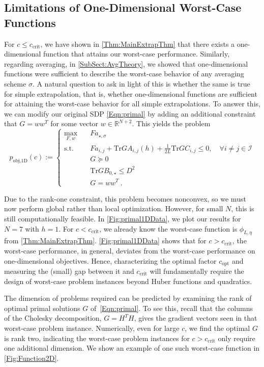 \documentclass[11pt]{article}
\numberwithin{equation}{section}
\newcommand{\R}{\mathbb{R}}
\newcommand{\Tr}{\text{Tr}}
\theoremstyle{definition}
\theoremstyle{definition}
\theoremstyle{definition}
\newcommand{\1}{\mathbf{1}}
\newcommand{\idxSpecial}{\sigma}
\newcommand{\cCrit}{c_\mathrm{crit}}
\begin{document}
\subsection{Limitations of One-Dimensional Worst-Case Functions} \label{SubSect:OneDimensional}
For $c\leq \cCrit$, we have shown in \cref{Thm:MainExtrapThm} that there exists a one-dimensional function that attains our worst-case performance. Similarly, regarding averaging, in \cref{SubSect:AvgTheory}, we showed that one-dimensional functions were sufficient to describe the worst-case behavior of any averaging scheme $\sigma$. A natural question to ask in light of this is whether the same is true for simple extrapolation, that is, whether one-dimensional  functions are sufficient for attaining the worst-case behavior for all simple extrapolations. To answer this, we can modify our original SDP \eqref{Eqn:primal} by adding an additional constraint that $G = ww^T$ for some vector $w \in \R^{N+2}$. This yields the problem
\begin{equation} \label{Eqn:primal1D}
    p_{\text{obj,1D}}(c) := \begin{cases} \max_{F,w} \quad & F a_{\star,\idxSpecial} \\
                    \text{s.t. } & Fa_{i,j} + \Tr G A_{i,j}(h) + \frac{1}{2L}\Tr G C_{i,j} \leq 0, \quad\forall i \neq j \in \mathcal{I}\\
                    & G \succeq 0 \\
                    & \Tr G B_{0,\star} \leq D^2 \\
                    & G = ww^T \ .
                \end{cases}
\end{equation}

Due to the rank-one constraint, this problem becomes nonconvex, so we must now perform global rather than local optimization. However, for small $N$, this is still computationally feasible. In \cref{Fig:primal1DData}, we plot our results for $N=7$ with $h=1$. For $c < \cCrit$, we already know the worst-case function is $\phi_{L,\eta}$ from \cref{Thm:MainExtrapThm}. \cref{Fig:primal1DData} shows that for $c>\cCrit$, the worst-case performance, in general, deviates from the worst-case performance on one-dimensional objectives. Hence, characterizing the optimal factor $c_{\text{opt}}$ and measuring the (small) gap between it and $\cCrit$ will fundamentally require the design of worst-case problem instances beyond Huber functions and quadratics.

The dimension of problems required can be predicted by examining the rank of optimal primal solutions $G$ of~\eqref{Eqn:primal}. To see this, recall that the columns of the Cholesky decomposition, $G = H^T H$, gives the gradient vectors seen in that worst-case problem instance. Numerically, even for large $c$, we find the optimal $G$ is rank two, indicating the worst-case problem instances for $c>\cCrit$ only require one additional dimension. We show an example of one such worst-case function in \cref{Fig:Function2D}.
\end{document}
